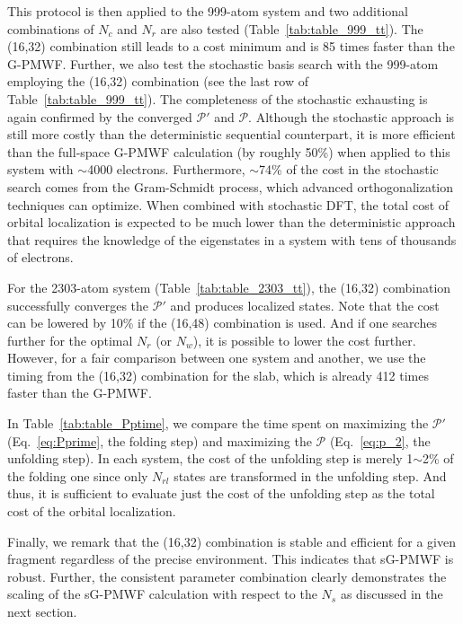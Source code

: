 \documentclass[journal=jacsat,manuscript=article]{achemso}
\begin{document}
This protocol is then applied to the 999-atom system and two additional combinations of $N_c$ and $N_r$ are also tested (Table~\ref{tab:table_999_tt}). The (16,32) combination still leads to a cost minimum and is 85 times faster than the G-PMWF. Further, we also test the stochastic basis search with the 999-atom employing the (16,32) combination (see the last row of Table~\ref{tab:table_999_tt}). The completeness of the stochastic exhausting is again confirmed by the converged $\mathcal{P}'$ and $\mathcal{P}$. Although the stochastic approach is still more costly than the deterministic sequential counterpart, it is more efficient than the full-space G-PMWF calculation (by roughly 50\%) when applied to this system with $\sim$4000 electrons. Furthermore, $\sim$74\% of the cost in the stochastic search comes from the Gram-Schmidt process, which advanced orthogonalization techniques can optimize. When combined with stochastic DFT, the total cost of orbital localization is expected to be much lower than the deterministic approach that requires the knowledge of the eigenstates in a system with tens of thousands of electrons.

For the 2303-atom system (Table~\ref{tab:table_2303_tt}), the (16,32) combination successfully converges the $\mathcal{P}'$ and produces localized states. Note that the cost can be lowered by 10\% if the (16,48) combination is used. And if one searches further for the optimal $N_r$ (or $N_w$), it is possible to lower the cost further. However, for a fair comparison between one system and another, we use the timing from the (16,32) combination for the slab, which is already 412 times faster than the G-PMWF.

In Table~\ref{tab:table_Pptime}, we compare the time spent on maximizing the $\mathcal{P}'$ (Eq.~\eqref{eq:Pprime}, the folding step) and maximizing the $\mathcal{P}$ (Eq.~\eqref{eq:p_2}, the unfolding step). In each system, the cost of the unfolding step is merely 1$\sim$2\% of the folding one since only $N_{rl}$ states are transformed in the unfolding step. And thus, it is sufficient to evaluate just the cost of the unfolding step as the total cost of the orbital localization.

Finally, we remark that the (16,32) combination is stable and efficient for a given fragment regardless of the precise environment. This indicates that sG-PMWF is robust. Further, the consistent parameter combination clearly demonstrates the scaling of the sG-PMWF calculation with respect to the $N_s$ as discussed in the next section.
\end{document}
